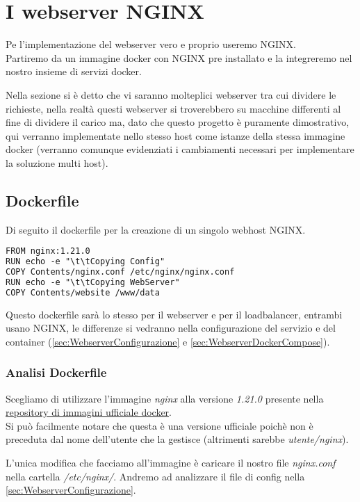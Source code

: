 \documentclass[../DocumentazioneProgetto.tex]{subfiles}
\begin{document}
	\section{I webserver NGINX}
	Pe l'implementazione del webserver vero e proprio useremo NGINX.\\
	Partiremo da un immagine docker con NGINX pre installato e la integreremo nel nostro insieme di servizi docker.

	Nella sezione \textit{} si è detto che vi saranno molteplici webserver tra cui dividere le richieste,
	nella realtà questi webserver si troverebbero su macchine differenti al fine di dividere il carico ma, dato che questo progetto è puramente dimostrativo, qui verranno implementate nello stesso host come istanze della stessa immagine docker (verranno comunque evidenziati i cambiamenti necessari per implementare la soluzione multi host).
	\subsection{Dockerfile} 
	\label{sec:WebserverDockerfile}
	Di seguito il dockerfile per la creazione di un singolo webhost NGINX.
	\begin{lstlisting}[language=XML, caption=Dockerfile Webserver NGINX] 
FROM nginx:1.21.0
RUN echo -e "\t\tCopying Config"
COPY Contents/nginx.conf /etc/nginx/nginx.conf
RUN echo -e "\t\tCopying WebServer"
COPY Contents/website /www/data\end{lstlisting}
	Questo dockerfile sarà lo stesso per il webserver e per il loadbalancer, entrambi usano NGINX, le differenze si vedranno nella configurazione del servizio e del container (\autoref{sec:WebserverConfigurazione} e \autoref{sec:WebserverDockerCompose}).
	\subsubsection{Analisi Dockerfile} 
	Scegliamo di utilizzare l'immagine \textit{nginx} alla versione \textit{1.21.0} presente nella \href{https://hub.docker.com/_/nginx}{repository di immagini ufficiale docker}.\\ 
	Si può facilmente notare che questa è una versione ufficiale poichè non	è preceduta dal nome dell'utente che la gestisce 
	(altrimenti sarebbe \textit{utente/nginx}).

	L'unica modifica che facciamo all'immagine è caricare il nostro file \textit{nginx.conf} nella cartella \textit{/etc/nginx/}. Andremo ad analizzare il file di config nella \autoref{sec:WebserverConfigurazione}.
	
\end{document}
